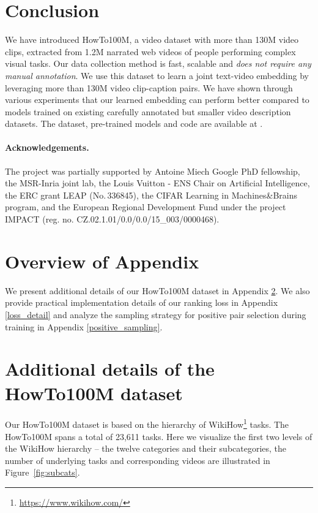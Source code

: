 \documentclass[10pt,twocolumn,letterpaper]{article}
\begin{document}
\section{Conclusion}
We have introduced HowTo100M, a video dataset with more than 130M video clips, extracted from 1.2M narrated web videos of people performing complex visual tasks.
Our data collection method is fast, scalable and \textit{does not require any manual annotation}.
We use this dataset to learn a joint text-video embedding by leveraging more than 130M video clip-caption pairs.
We have shown through various experiments that our learned embedding can perform better compared to models trained on existing carefully annotated but smaller video description datasets.
The dataset, pre-trained models and code are available at \cite{iccv2019howto100m}.

\clearpage

\paragraph{Acknowledgements.}
The project was partially supported by 
Antoine Miech Google PhD fellowship, the MSR-Inria joint lab, the Louis Vuitton - ENS Chair on 
Artificial Intelligence, the ERC grant LEAP (No.\,336845), the CIFAR 
Learning in Machines\&Brains program, and the European Regional 
Development Fund under the project IMPACT (reg. no. 
CZ.02.1.01/0.0/0.0/15\_003/0000468).


{\small


}
\clearpage

\clearpage
\appendix

\section*{Overview of Appendix}
We present additional details of our HowTo100M dataset in Appendix \ref{howto100mdetail}.
We also provide practical implementation details of our ranking loss in Appendix \ref{loss_detail} and analyze the sampling strategy for positive pair selection during training in Appendix \ref{positive_sampling}.





\section{Additional details of the HowTo100M dataset}  \label{howto100mdetail}
Our HowTo100M dataset is based on the hierarchy of WikiHow\footnote{\url{https://www.wikihow.com/}} tasks.
The HowTo100M spans a total of 23,611 tasks. Here we visualize the first two levels of the WikiHow hierarchy -- the twelve categories and their subcategories, the number of underlying tasks and corresponding videos are illustrated in Figure~\ref{fig:subcats}.
\end{document}
